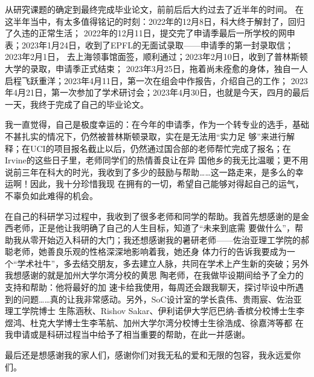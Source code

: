 
\begin{acknowledgements}

从研究课题的确定到最终完成毕业论文，前前后后大约过去了近半年的时间。
在这半年当中，有太多值得铭记的时刻：2022年的12月8日，科大终于解封了，回归了久违的正常生活；
2022年的12月11日，提交完了申请季最后一所学校的网申表；2023年1月24日，收到了EPFL的无面试录取——申请季的第一封录取信；2023年2月1日，
去上海领事馆面签，顺利通过；2023年2月10日，收到了普林斯顿大学的录取，申请季正式结束；
2023年3月25日，拖着尚未痊愈的身体，独自一人启程飞跃重洋；2023年4月11日，第一次在组会中作报告，介绍自己的工作；
2023年4月21日，第一次参加了学术研讨会；2023年4月30日，也就是今天，四月的最后一天，我终于完成了自己的毕业论文。

我一直觉得，自己是极度幸运的：在今年的申请季，作为一个转专业的选手，基础不甚扎实的情况下，仍然被普林斯顿录取，实在是无法用“实力足
够”来进行解释；在UCI的项目报名截止以后，仍然通过国合部的老师帮忙完成了报名；在Irvine的这些日子里，老师同学们的热情善良让在异
国他乡的我无比温暖；更不用说前三年在科大的时光，我收到了多少的鼓励与帮助……这一路走来，是多么的幸运啊！因此，我十分珍惜我现
在拥有的一切，希望自己能够对得起自己的运气，不辜负如此难得的机会。

在自己的科研学习过程中，我收到了很多老师和同学的帮助。我首先想感谢的是金西老师，正是他让我明确了自己的人生目标，知道了“未来到底需
要做什么”，帮助我从零开始迈入科研的大门；我还想感谢我的暑研老师——佐治亚理工学院的郝聪老师，她善良乐观的性格深深地影响着我，她还身
体力行的告诉我要成为一个“学术社牛”，多去结交朋友，多去建立人脉，共同在学术上产生新的突破；另外我想感谢的就是加州大学尔湾分校的黄思
陶老师，在我做毕设期间给予了全力的支持和帮助：他将最好的加
速卡给我使用，每周还会跟我聊天，探讨毕设中所遇到的问题……真的让我非常感动。另外，SoC设计室的学长袁伟、贵雨宸、佐治亚理工学院博士
生陈涵秋、Rishov Sakar、伊利诺伊大学厄巴纳-香槟分校博士生李煜鸿、杜克大学博士生李苇航、加州大学尔湾分校博士生徐浩成、徐嘉涔等都
在我申请或是科研过程当中给予了相当重要的帮助，在此一并感谢。

最后还是想感谢我的家人们，感谢你们对我无私的爱和无限的包容，我永远爱你们。

\end{acknowledgements}
